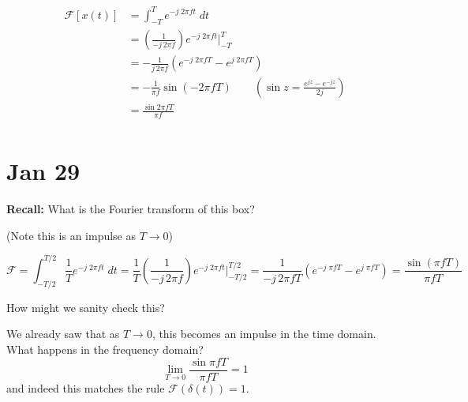 \documentclass[12pt]{report}
\newcommand{\F}{\mathcal{F}}
\newcommand*{\tbf}[1]{\ifmmode\mathbf{#1}\else\textbf{#1}\fi}
\begin{document}
\begin{align*}
    \F[x(t)] &= \int_{-T}^T e^{-j\; 2\pi ft} \;dt\\ 
    &= \left(\frac{1}{-j\, 2\pi f}\right) e^{-j\; 2\pi ft} \bigg\vert_{-T}^T\\ 
    &= -\frac{1}{j\, 2\pi f} \left(e^{-j\; 2\pi fT} - e^{j\; 2\pi fT}\right)  \\ 
    &= -\frac{1}{\pi f} \sin(-2\pi fT)  \qquad \left(\sin z = \frac{e^{jz} - e^{-jz}}{2j}\right) \\ 
    &= \frac{\sin 2\pi fT}{\pi f} \\ 
\end{align*}

\begin{center}
\end{center}

\section{Jan 29}

\tbf{Recall:} What is the Fourier transform of this box? 

\begin{center}
\end{center}

(Note this is an impulse as $T \to 0$)

\[\F = \int_{-T/2}^{T/2} \frac{1}{T} e^{-j\; 2\pi ft}\; dt = \frac{1}{T} \left(\frac{1}{-j\, 2\pi f}\right) e^{-j\; 2\pi ft} \bigg\vert_{-T/2}^{T/2} = \frac{1}{-j\, 2\pi f T} \left(e^{-j\; \pi f T} - e^{j\; \pi f T}\right) = \frac{\sin(\pi f T)}{\pi f T} \]

How might we sanity check this? 

We already saw that as $T \to 0$, this becomes an impulse in the time domain. What happens in the frequency domain?
\[\lim_{T \to 0} \frac{\sin \pi f T}{\pi f T} = 1\]
and indeed this matches the rule $\F(\delta(t)) = 1$.
\end{document}
